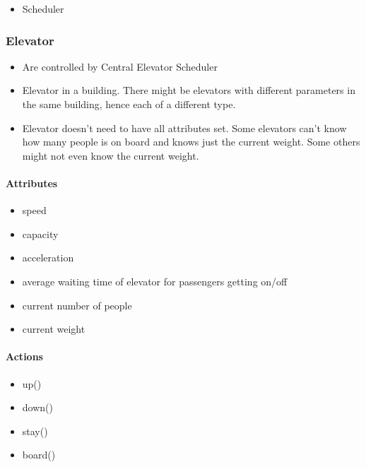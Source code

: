 \begin{itemize}
\tightlist
\item
  Scheduler
\end{itemize}

\hypertarget{elevator}{%
\subsubsection{\texorpdfstring{\textbf{Elevator}}{Elevator}}\label{elevator}}

\begin{itemize}
\tightlist
\item
  Are controlled by Central Elevator Scheduler
\item
  Elevator in a building. There might be elevators with different
  parameters in the same building, hence each of a different type.
\item
  Elevator doesn't need to have all attributes set. Some elevators can't
  know how many people is on board and knows just the current weight.
  Some others might not even know the current weight.
\end{itemize}

\hypertarget{attributes-1}{%
\paragraph{Attributes}\label{attributes-1}}

\begin{itemize}
\tightlist
\item
  speed
\item
  capacity
\item
  acceleration
\item
  average waiting time of elevator for passengers getting on/off
\item
  current number of people
\item
  current weight
\end{itemize}

\hypertarget{actions}{%
\paragraph{Actions}\label{actions}}

\begin{itemize}
\tightlist
\item
  up()
\item
  down()
\item
  stay()
\item
  board()
\end{itemize}

